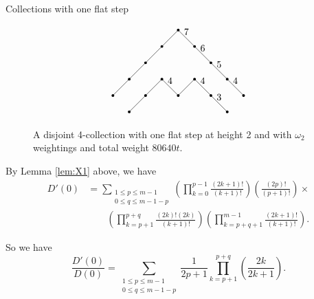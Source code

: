 \documentclass[12pt]{beamer}
\begin{document}
\begin{frame}[allowframebreaks]{Collections with one flat step}
\begin{figure}
\begin{equation*}
\begin{tikzpicture}[scale=0.60]
	\node at (1,3) [circle, fill, inner sep=1pt]{};
	\node at (2,4) [circle, fill, inner sep=1pt]{};
	\node at (3,5) [circle, fill, inner sep=1pt]{};
	\node at (4,4) [circle, fill, inner sep=1pt]{};
	\node at (5,5) [circle, fill, inner sep=1pt]{};
	\node at (6,4) [circle, fill, inner sep=1pt]{};
	\node at (7,3) [circle, fill, inner sep=1pt]{};
	\draw (1,3) -- (3,5);
	\draw (3,5) -- node[above] {4} (4,4);
	\draw (4,4) -- (5,5);
	\draw (5,5) -- node[above] {4} (6,4);
	\draw (6,4) -- node[above] {3} (7,3);
	
	\node at (0,4) [circle, fill, inner sep=1pt]{};
	\node at (1,5) [circle, fill, inner sep=1pt]{};
	\node at (2,6) [circle, fill, inner sep=1pt]{};
	\node at (3,7) [circle, fill, inner sep=1pt]{};
	\node at (4,8) [circle, fill, inner sep=1pt]{};
	\node at (5,7) [circle, fill, inner sep=1pt]{};
	\node at (6,6) [circle, fill, inner sep=1pt]{};
	\node at (7,5) [circle, fill, inner sep=1pt]{};
	\node at (8,4) [circle, fill, inner sep=1pt]{};
	\draw (0,4) -- (4,8);
	\draw (4,8) -- node[above] {7} (5,7);
	\draw (5,7) -- node[above] {6} (6,6);
	\draw (6,6) -- node[above] {5} (7,5);
	\draw (7,5) -- node[above] {4} (8,4);
\end{tikzpicture}
\end{equation*}
\caption{\label{fig:oneflatstepscentered} A disjoint 4-collection with one flat step at height 2 and with $\omega_2$ weightings and total weight $80640t$.}
\end{figure}

\framebreak

By Lemma \ref{lem:X1} above, we have
\begin{align*}
D'(0) &= \sum\limits_{\substack{1\leq p\leq m-1\\0\leq q\leq m-1-p}}\left(\prod\limits_{k=0}^{p-1}\frac{(2k+1)!}{(k+1)!}\right)\left(\frac{(2p)!}{(p+1)!}\right) \times \\
&\qquad \left(\prod\limits_{k=p+1}^{p+q}\frac{(2k)!(2k)}{(k+1)!}\right)\left(\prod\limits_{k=p+q+1}^{m-1}\frac{(2k+1)!}{(k+1)!}\right).
\end{align*}

So we have
\begin{equation*}\label{eqn:D'/D}
\frac{D'(0)}{D(0)} = \sum\limits_{\substack{1\leq p \leq m-1 \\ 0 \leq q \leq m - 1 - p}}\frac{1}{2p+1}\prod\limits_{k=p+1}^{p+q}\left(\frac{2k}{2k+1}\right).
\end{equation*}

\end{frame}
\end{document}
